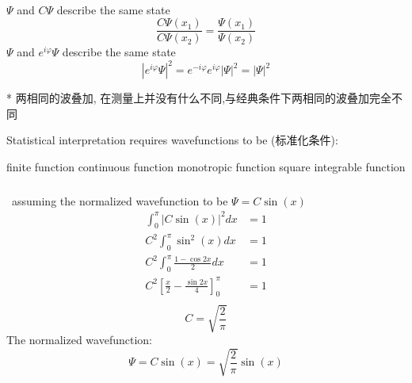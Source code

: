 \begin{frame}
    \frametitle{}
    \Tips \\
    \begin{itemize}
        \Item $\Psi$ and $C\Psi$ describe the same state 
        \[ \frac{C\Psi(x_1)}{C\Psi(x_2)} = \frac{\Psi(x_1)}{\Psi(x_2)}\]
        \Item $\Psi$ and $e^{i\varphi}\Psi$ describe the same state 
         \[ |e^{i\varphi}\Psi|^2 = e^{-i\varphi} e^{i\varphi} |\Psi|^2 = |\Psi|^2 \] 
    \end{itemize}  
    * 两相同的波叠加, 在测量上并没有什么不同,与经典条件下两相同的波叠加完全不同
\end{frame}

\begin{frame}
    Statistical interpretation requires wavefunctions to be (标准化条件):
    \begin{itemize}
        \Item finite  function
        \Item continuous function 
        \Item monotropic function
        \Item square integrable function 
    \end{itemize}
\end{frame}

\begin{frame}[allowframebreaks=]
    \frametitle{}
    \Solution ~assuming the normalized wavefunction to be 
    $\Psi=C\sin(x)$
    \begin{equation*}
        \begin{split}
            \int_0 ^\pi |C\sin(x)|^2 dx &=1 \\
            C^2 \int_0 ^\pi \sin^2(x) dx &=1 \\
            C^2 \int_0 ^\pi \frac{1-\cos 2x }{2} dx &=1 \\ 
            C^2 [\frac{x}{2}-\frac{\sin 2x}{4}]_0 ^\pi &=1 \\ 
        \end{split} 
     \end{equation*}
     \[C=\sqrt{\frac{2}{\pi}}\]
     The normalized wavefunction:
     \begin{equation*}
        \Psi=C\sin(x)=\sqrt{\frac{2}{\pi}}\sin(x)
    \end{equation*}
\end{frame}

